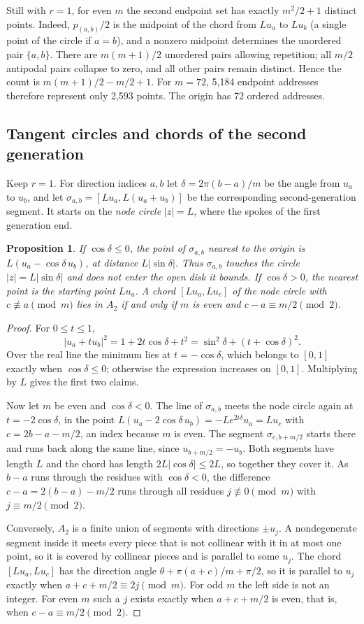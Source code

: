 \documentclass[11pt,a4paper]{article}
\newtheorem{proposition}{Proposition}
\begin{document}
Still with $r=1$, for even $m$ the second endpoint set has exactly
$m^2/2+1$ distinct points. Indeed, $p_{(a,b)}/2$ is the midpoint of the chord
from $Lu_a$ to $Lu_b$ (a single point of the circle if $a=b$), and a nonzero
midpoint determines the unordered pair $\{a,b\}$. There are $m(m+1)/2$
unordered pairs allowing repetition; all $m/2$ antipodal pairs collapse to
zero, and all other pairs remain distinct. Hence the count is
$m(m+1)/2-m/2+1$. For $m=72$, 5,184 endpoint addresses therefore represent
only 2,593 points. The origin has 72 ordered addresses.

\subsection*{Tangent circles and chords of the second generation}
Keep $r=1$. For direction indices $a,b$ let $\delta=2\pi(b-a)/m$ be the angle
from $u_a$ to $u_b$, and let $\sigma_{a,b}=[Lu_a,L(u_a+u_b)]$ be the
corresponding second-generation segment. It starts on the \emph{node circle}
$|z|=L$, where the spokes of the first generation end.

\begin{proposition}
If $\cos\delta\le0$, the point of $\sigma_{a,b}$ nearest to the origin is
$L(u_a-\cos\delta\,u_b)$, at distance $L|\sin\delta|$. Thus $\sigma_{a,b}$
touches the circle $|z|=L|\sin\delta|$ and does not enter the open disk it
bounds. If $\cos\delta>0$, the nearest point is the starting point $Lu_a$.
A chord $[Lu_a,Lu_c]$ of the node circle with $c\not\equiv a\pmod m$ lies in
$A_2$ if and only if $m$ is even and $c-a\equiv m/2\pmod2$.
\end{proposition}
\begin{proof}
For $0\le t\le1$,
\[
|u_a+tu_b|^2=1+2t\cos\delta+t^2=\sin^2\delta+(t+\cos\delta)^2.
\]
Over the real line the minimum lies at $t=-\cos\delta$, which belongs to
$[0,1]$ exactly when $\cos\delta\le0$; otherwise the expression increases on
$[0,1]$. Multiplying by $L$ gives the first two claims.

Now let $m$ be even and $\cos\delta<0$. The line of $\sigma_{a,b}$ meets the
node circle again at $t=-2\cos\delta$, in the point
$L(u_a-2\cos\delta\,u_b)=-Le^{2i\delta}u_a=Lu_c$ with
$c=2b-a-m/2$, an index because $m$ is even. The segment
$\sigma_{c,b+m/2}$ starts there and runs back along the same line, since
$u_{b+m/2}=-u_b$. Both segments have length $L$ and the chord has length
$2L|\cos\delta|\le2L$, so together they cover it. As $b-a$ runs through the
residues with $\cos\delta<0$, the difference $c-a=2(b-a)-m/2$ runs through
all residues $j\not\equiv0\pmod m$ with $j\equiv m/2\pmod2$.

Conversely, $A_2$ is a finite union of segments with directions $\pm u_j$. A
nondegenerate segment inside it meets every piece that is not collinear with
it in at most one point, so it is covered by collinear pieces and is
parallel to some $u_j$. The chord $[Lu_a,Lu_c]$ has the direction angle
$\theta+\pi(a+c)/m+\pi/2$, so it is parallel to $u_j$ exactly when
$a+c+m/2\equiv2j\pmod m$. For odd $m$ the left side is not an integer. For
even $m$ such a $j$ exists exactly when $a+c+m/2$ is even, that is, when
$c-a\equiv m/2\pmod2$.
\end{proof}
\end{document}
